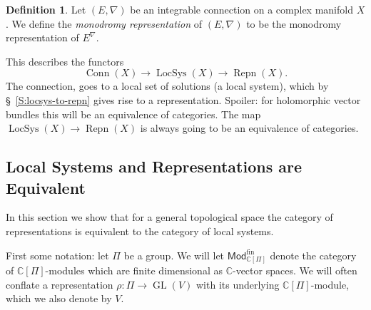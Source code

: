 \documentclass[12pt]{book}
\numberwithin{equation}{section}
\theoremstyle{definition}
\newtheorem{definition}[theorem]{Definition}
\theoremstyle{remark}
\newcommand{\CC}{\mathbb{C}}
\newcommand{\GL}{\operatorname{GL}}
\newcommand{\LocSys}{\operatorname{LocSys}}
\newcommand{\Mod}{\mathsf{Mod}}
\newcommand{\fin}{\operatorname{fin}}
\newcommand{\Conn}{\operatorname{Conn}}
\newcommand{\Repn}{\operatorname{Repn}}
\begin{document}
\begin{definition}
	Let $(E,\nabla)$ be an integrable connection on a complex manifold $X$. 
	We define the \emph{monodromy representation} of $(E,\nabla)$ to be the monodromy representation of $E^{\nabla}$.
\end{definition}

This describes the functors
 $$ \Conn(X) \to \LocSys(X) \to \Repn(X).$$
The connection, goes to a local set of solutions (a local system), which by \S~\ref{S:locsys-to-repn} gives rise to a representation. 
Spoiler: for holomorphic vector bundles this will be an equivalence of categories. 
The map $\LocSys(X) \to \Repn(X)$ is always going to be an equivalence of categories. 


\subsection{Local Systems and Representations are Equivalent}\label{S:locsys-repn}
In this section we show that for a general topological space the category of representations is equivalent to the category of local systems. 

First some notation: let $\Pi$ be a group. 
We will let $\Mod^{\fin}_{\CC[\Pi]}$ denote the category of $\CC[\Pi]$-modules which are finite dimensional as $\CC$-vector spaces. 
We will often conflate a representation $\rho: \Pi \to \GL(V)$ with its underlying  $\CC[\Pi]$-module, which we also denote by $V$.  
\end{document}

